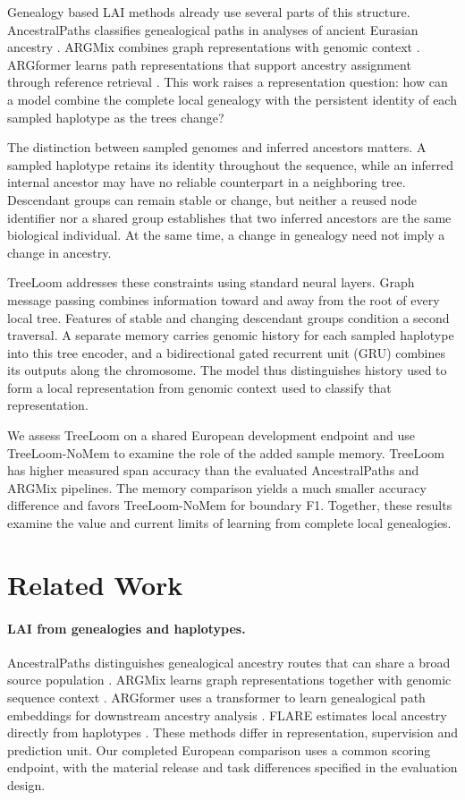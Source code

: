 \documentclass[letterpaper]{article}
\begin{document}
Genealogy based LAI methods already use several parts of this structure. AncestralPaths classifies genealogical paths in analyses of ancient Eurasian ancestry \citep{eurasians2024}. ARGMix combines graph representations with genomic context \citep{ancientancestry2026}. ARGformer learns path representations that support ancestry assignment through reference retrieval \citep{argformer2026}. This work raises a representation question: how can a model combine the complete local genealogy with the persistent identity of each sampled haplotype as the trees change?

The distinction between sampled genomes and inferred ancestors matters. A sampled haplotype retains its identity throughout the sequence, while an inferred internal ancestor may have no reliable counterpart in a neighboring tree. Descendant groups can remain stable or change, but neither a reused node identifier nor a shared group establishes that two inferred ancestors are the same biological individual. At the same time, a change in genealogy need not imply a change in ancestry.

TreeLoom addresses these constraints using standard neural layers. Graph message passing combines information toward and away from the root of every local tree. Features of stable and changing descendant groups condition a second traversal. A separate memory carries genomic history for each sampled haplotype into this tree encoder, and a bidirectional gated recurrent unit (GRU) combines its outputs along the chromosome. The model thus distinguishes history used to form a local representation from genomic context used to classify that representation.

We assess TreeLoom on a shared European development endpoint and use TreeLoom-NoMem to examine the role of the added sample memory. TreeLoom has higher measured span accuracy than the evaluated AncestralPaths and ARGMix pipelines. The memory comparison yields a much smaller accuracy difference and favors TreeLoom-NoMem for boundary F1. Together, these results examine the value and current limits of learning from complete local genealogies.

\section{Related Work}
\paragraph{LAI from genealogies and haplotypes.}
AncestralPaths distinguishes genealogical ancestry routes that can share a broad source population \citep{eurasians2024}. ARGMix learns graph representations together with genomic sequence context \citep{ancientancestry2026}. ARGformer uses a transformer to learn genealogical path embeddings for downstream ancestry analysis \citep{argformer2026}. FLARE estimates local ancestry directly from haplotypes \citep{flare2023}. These methods differ in representation, supervision and prediction unit. Our completed European comparison uses a common scoring endpoint, with the material release and task differences specified in the evaluation design.
\end{document}
